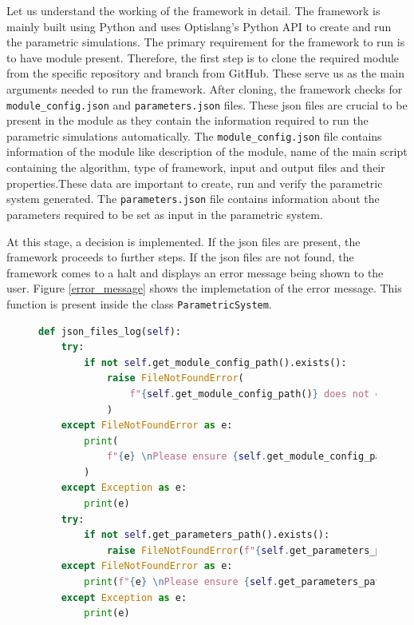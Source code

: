 Let us understand the working of the framework in detail. The framework is mainly built using Python and uses Optislang's Python API to create and run the 
parametric simulations. The primary requirement for the framework to run is to have module present. Therefore, the first step is to clone the required module
from the specific repository and branch from GitHub. These serve us as the main arguments needed to run the framework. After cloning, the framework checks for 
\texttt{module\_config.json} and \texttt{parameters.json} files. These \acrshort{json} files are crucial to be present in the module as they contain the 
information required to run the parametric simulations automatically. The \texttt{module\_config.json} file contains information of 
the module like description of the module, name of the main script containing the algorithm, type of framework, input and output files and their properties.These data are important 
to create, run and verify the parametric system generated. The \texttt{parameters.json} file contains information about the parameters required to be set as input 
in the parametric system.

At this stage, a decision is implemented. If the \acrshort{json} files are present, the framework proceeds to further steps. If the \acrshort{json} files are not found, the framework
comes to a halt and displays an error message being shown to the user. Figure \ref{error_message} shows the implemetation of the error message. This function is present
inside the class \texttt{ParametricSystem}.
\begin{figure}[!ht]
    \centering
    \renewcommand{\lstlistingname}{Code}
    \lstset{style=pythoncode}
    \begin{lstlisting}[language=python, caption= Function to verify existance of \acrshort{json} files, label={error_message}]
def json_files_log(self):
    try:
        if not self.get_module_config_path().exists():
            raise FileNotFoundError(
                f"{self.get_module_config_path()} does not exist"
            )
    except FileNotFoundError as e:
        print(
            f"{e} \nPlease ensure {self.get_module_config_path()} exists and re-run"
        )
    except Exception as e:
        print(e)
    try:
        if not self.get_parameters_path().exists():
            raise FileNotFoundError(f"{self.get_parameters_path()} does not exist")
    except FileNotFoundError as e:
        print(f"{e} \nPlease ensure {self.get_parameters_path} exists and re-run")
    except Exception as e:
        print(e)
\end{lstlisting}
\end{figure}




